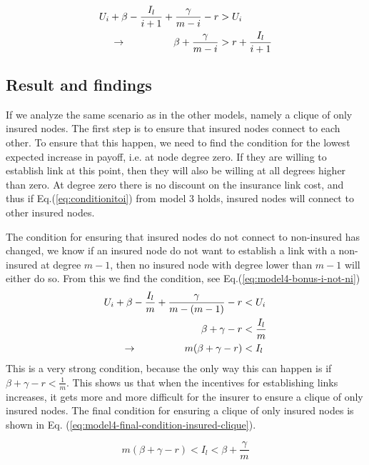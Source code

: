 \begin{eqnarray}
U_{i}+\beta-\frac{I_{l}}{i+1}+\frac{\gamma}{m-i}-r&>U_{i} \nonumber \\ 
\llap{$\rightarrow$\hspace{50pt}}\beta+\frac{\gamma}{m-i}&>r+\frac{I_{l}}{i+1}
\label{eq:model4-bonus-i-to-ni-final}
\end{eqnarray}

\subsection{Result and findings}
If we analyze the same scenario as in the other models, namely a clique of only insured nodes. The first step is to ensure that insured nodes connect to each other. To ensure that this happen, we need to find the condition for the lowest expected increase in payoff, i.e. at node degree zero. If they are willing to establish link at this point, then they will also be willing at all degrees higher than zero.
At degree zero there is no discount on the insurance link cost, and thus if Eq.(\ref{eq:conditionitoi}) from model 3 holds, insured nodes will connect to other insured nodes.

The condition for ensuring that insured nodes do not connect to non-insured has changed, we know if an insured node do not want to establish a link with a non-insured at degree $m-1$, then no insured node with degree lower than $m-1$ will either do so. From this we find the condition, see Eq.(\ref{eq:model4-bonus-i-not-ni})
\begin{eqnarray}
U_{i}+\beta-\frac{I_{l}}{m}+\frac{\gamma}{m-(m-1)}-r&<U_{i} \nonumber \\ 
\beta+\gamma-r&<\frac{I_{l}}{m}\nonumber \\ 
\llap{$\rightarrow$\hspace{50pt}}m(\beta +\gamma-r)&<I_{l}\nonumber
\label{eq:model4-bonus-i-not-ni}
\end{eqnarray}
This is a very strong condition, because the only way this can happen is if $\beta+\gamma-r<\frac{1}{m}$.  This shows us that when the incentives for establishing links increases, it gets more and more difficult for the insurer to ensure a clique of only insured nodes. 
The final condition for ensuring a clique of only insured nodes is shown in Eq. (\ref{eq:model4-final-condition-insured-clique}).

\begin{equation}
m(\beta +\gamma-r)<I_{l}<\beta+\frac{\gamma}{m}
\label{eq:model4-final-condition-insured-clique}
\end{equation}

